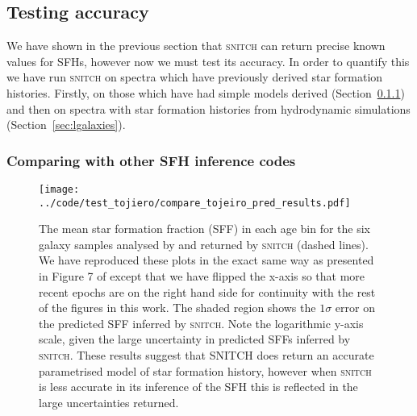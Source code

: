 \documentclass[useAMS,usenatbib]{mn2e}
\begin{document}
\subsection{Testing accuracy}\label{sec:accuracytest}

We have shown in the previous section that \textsc{snitch} can return precise known values for SFHs, however now we must test its accuracy. In order to quantify this we have run \textsc{snitch} on spectra which have previously derived star formation histories. Firstly, on those which have had simple models derived (Section~\ref{secsec:compare}) and then on spectra with star formation histories from hydrodynamic simulations (Section~\ref{sec:lgalaxies}).

\subsubsection{Comparing with other SFH inference codes}\label{secsec:compare}

\begin{figure}
\centering
\texttt{[image: ../code/test\_tojiero/compare\_tojeiro\_pred\_results.pdf]}
\caption{The mean star formation fraction (SFF) in each age bin for the six galaxy samples analysed by \protect\cite[][solid lines]{tojeiro13} and returned by \textsc{snitch} (dashed lines). We have reproduced these plots in the exact same way as presented in Figure 7 of \citeauthor{tojeiro13} except that we have flipped the x-axis so that more recent epochs are on the right hand side for continuity with the rest of the figures in this work. The shaded region shows the $1\sigma$ error on the predicted SFF inferred by \textsc{snitch}. Note the logarithmic y-axis scale, given the large uncertainty in predicted SFFs inferred by \textsc{snitch}. These results suggest that \textsc{SNITCH} does return an accurate parametrised model of star formation history, however when \textsc{snitch} is less accurate in its inference of the SFH this is reflected in the large uncertainties returned. }
\label{fig:tojeirocompare}
\end{figure}
\end{document}
